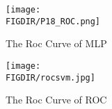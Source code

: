 \begin{figure}[ht]
\centering
\texttt{[image: \\FIGDIR/P18\_ROC.png]}
\caption{The Roc Curve of MLP}
\label{roc}
\end{figure}

\begin{figure}[ht]
\centering
\texttt{[image: \\FIGDIR/rocsvm.jpg]}
\caption{The Roc Curve of ROC}
\label{rocs}
\end{figure}